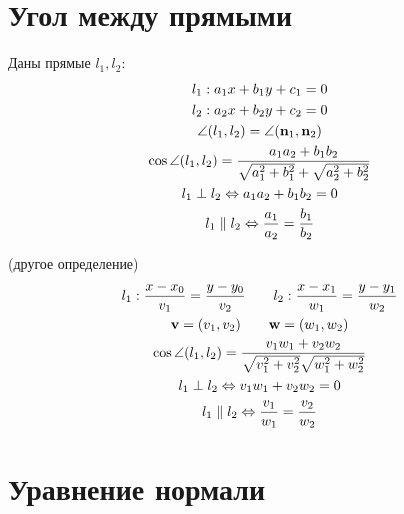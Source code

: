 
\section{Угол между прямыми}

\begin{definition}
    Даны прямые $l_1, l_2$:
    \begin{gather*}
        l_1: a_1x +b_1y + c_1 = 0\\
        l_2: a_2x +b_2y + c_2 = 0\\
        \angle(l_1, l_2) = \angle (\mathbf{n}_1, \mathbf{n}_2)\\
        \cos \angle(l_1, l_2) = \frac{a_1a_2+b_1b_2}{\sqrt{a_1^2 + b_1^2} + \sqrt{a_2^2 + b_2^2}}\\
        l_1 \perp l_2 \Leftrightarrow a_1 a_2 + b_1 b_2 = 0\\
        l_1 \parallel l_2 \Leftrightarrow \frac{a_1}{a_2} = \frac{b_1}{b_2}
    \end{gather*}  
\end{definition}



\begin{definition}(другое определение)
    \begin{gather*}
        l_1: \frac{x-x_0}{v_1}=\frac{y-y_0}{v_2} \qquad l_2: \frac{x-x_1}{w_1} = \frac{y-y_1}{w_2}\\
        \mathbf{v} = (v_1, v_2) \qquad \mathbf{w} = (w_1, w_2)\\
        \cos \angle(l_1, l_2) = \frac{v_1 w_1 + v_2 w_2}{\sqrt{v_1^2 + v_2^2}\sqrt{w_1^2 + w_2^2}}\\
        l_1 \perp l_2 \Leftrightarrow v_1 w_1 + v_2 w_2 = 0\\
        l_1 \parallel l_2 \Leftrightarrow \frac{v_1}{w_1} = \frac{v_2}{w_2}
    \end{gather*}
\end{definition}

\section{Уравнение нормали}

